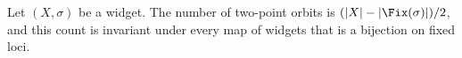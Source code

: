 \begin{conjecture}\label{dm-0006}
Let $(X,\sigma)$ be a widget. The number of two-point orbits is $(|X| - |\Fix(\sigma)|)/2$, and this count is invariant under every map of widgets that is a bijection on fixed loci.
\end{conjecture}